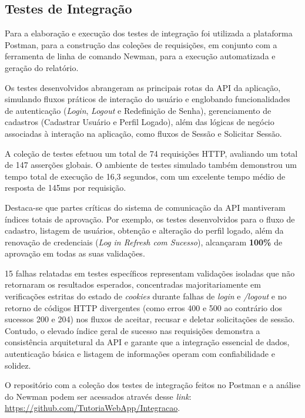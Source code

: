 \subsection[Testes de Integração]{Testes de Integração}

Para a elaboração e execução dos testes de integração foi utilizada a plataforma Postman, para a construção das coleções de requisições, em conjunto com a ferramenta de linha de comando Newman, para a execução automatizada e geração do relatório.

Os testes desenvolvidos abrangeram as principais rotas da API da aplicação, simulando fluxos práticos de interação do usuário e englobando funcionalidades de autenticação (\textit{Login}, \textit{Logout} e Redefinição de Senha), gerenciamento de cadastros (Cadastrar Usuário e Perfil Logado), além das lógicas de negócio associadas à interação na aplicação, como fluxos de Sessão e Solicitar Sessão.

A coleção de testes efetuou um total de 74 requisições HTTP, avaliando um total de 147 asserções globais. O ambiente de testes simulado também demonstrou um tempo total de execução de 16,3 segundos, com um excelente tempo médio de resposta de 145ms por requisição.

Destaca-se que partes críticas do sistema de comunicação da API mantiveram índices totais de aprovação. Por exemplo, os testes desenvolvidos para o fluxo de cadastro, listagem de usuários, obtenção e alteração do perfil logado, além da renovação de credenciais (\textit{Log in Refresh com Sucesso}), alcançaram \textbf{100\%} de aprovação em todas as suas validações.

15 falhas relatadas em testes específicos representam validações isoladas que não retornaram os resultados esperados, concentradas majoritariamente em verificações estritas do estado de \textit{cookies} durante falhas de \textit{login} e \textit{/logout} e no retorno de códigos HTTP divergentes (como erros 400 e 500 ao contrário dos sucessos 200 e 204) nos fluxos de aceitar, recusar e deletar solicitações de sessão. Contudo, o elevado índice geral de sucesso nas requisições demonstra a consistência arquitetural da API e garante que a integração essencial de dados, autenticação básica e listagem de informações operam com confiabilidade e solidez.

O repositório com a coleção dos testes de integração feitos no Postman e a análise do Newman podem ser acessados através desse \textit{link}: \url{https://github.com/TutoriaWebApp/Integracao}.

